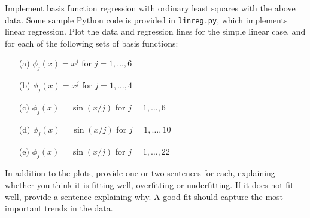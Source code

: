 \documentclass[submit]{harvardml}
\begin{document}
	\begin{problem}
		Implement basis function regression with ordinary least squares with the above
		data. Some sample Python code is provided in \verb|linreg.py|, which implements
		linear regression.  Plot the data and regression lines for the simple linear
		case, and for each of the following sets of basis functions:
		\begin{itemize}
			\item[(a)] $\phi_j(x) = x^j$ for $j=1, \ldots, 6$
			\item[(b)] $\phi_j(x) = x^j$ for $j=1, \ldots, 4$
			\item[(c)] $\phi_j(x) = \sin(x / j)$ for $j=1, \ldots, 6$
			\item[(d)] $\phi_j(x) = \sin(x / j)$ for $j=1, \ldots, 10$
			\item[(e)] $\phi_j(x) = \sin(x / j)$ for $j=1, \ldots, 22$
		\end{itemize}
		In addition to the plots, provide one or two sentences for each, explaining
		whether you think it is fitting well, overfitting or underfitting.  If it does
		not fit well, provide a sentence explaining why. A good fit should capture the
		most important trends in the data.
	\end{problem}
	
\end{document}
